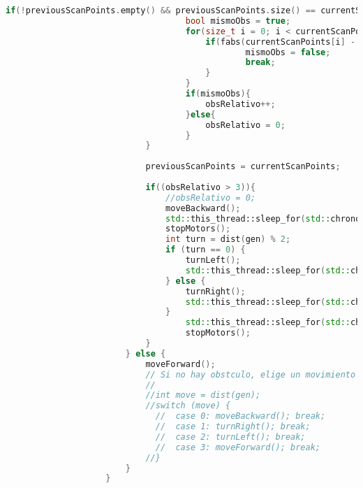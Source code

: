 \begin{lstlisting}[language={C++}, caption={Primer ajuste de c\'odigo}, label={Script}]
                            if(!previousScanPoints.empty() && previousScanPoints.size() == currentScanPoints.size()){
                                    bool mismoObs = true;
                                    for(size_t i = 0; i < currentScanPoints.size(); ++i){
                                        if(fabs(currentScanPoints[i] - previousScanPoints[i]) > 0.05){
                                                mismoObs = false;
                                                break;
                                        }
                                    }
                                    if(mismoObs){
                                        obsRelativo++;
                                    }else{
                                        obsRelativo = 0;
                                    }
                            }
                            
                            previousScanPoints = currentScanPoints;
                            
                            if((obsRelativo > 3)){
                                //obsRelativo = 0;
                                moveBackward();
                                std::this_thread::sleep_for(std::chrono::seconds(3));
                                stopMotors();
                                int turn = dist(gen) % 2;
                                if (turn == 0) {
                                    turnLeft();
                                    std::this_thread::sleep_for(std::chrono::seconds(5));
                                } else {
                                    turnRight();
                                    std::this_thread::sleep_for(std::chrono::seconds(5));
                                }
                                    std::this_thread::sleep_for(std::chrono::seconds(2));
                                    stopMotors();
                            }
                        } else {
                            moveForward();
                            // Si no hay obstculo, elige un movimiento aleatorio
                            //
                            //int move = dist(gen);
                            //switch (move) {
                              //  case 0: moveBackward(); break;
                              //  case 1: turnRight(); break;
                              //  case 2: turnLeft(); break;
                              //  case 3: moveForward(); break;
                            //}
                        }
                    }
                    

\end{lstlisting}
